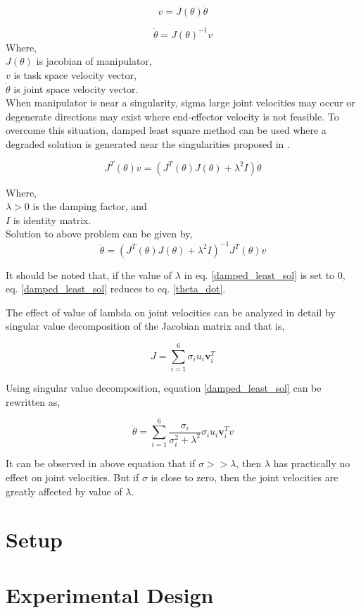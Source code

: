 \begin{equation}\label{theta_dot}
	v = J(\theta) \dot{\theta} 
\end{equation}

\begin{equation}
	\dot{\theta} = J(\theta)^{-1}  v
\end{equation} 
Where, \\
$J(\theta)$ is jacobian of manipulator, \\
$v$ is task space velocity vector, \\
$\dot{\theta}$ is joint space velocity vector. \\

When manipulator is near a singularity, sigma  large joint velocities may occur or degenerate directions may exist where end-effector velocity
is not feasible\cite{chiaverini1994review}. To overcome this situation, damped least square method can be used where a degraded solution is generated near the singularities proposed in \cite{wampler1986manipulator, nakamura1986inverse}.  

\begin{equation}
	J^{T}(\theta)v = (J^{T}(\theta)J(\theta) + \lambda ^{2}I)\dot{\theta}
\end{equation}

Where, \\
$\lambda > 0 $ is the damping factor, and \\
$I $ is identity matrix. \\

Solution to above problem can be given by, 
\begin{equation}\label{damped_least_sol}
	\dot{\theta} = (J^{T}(\theta)J(\theta) + \lambda^{2}I)^{-1}J^{T}(\theta)v
\end{equation} 

It should be noted that, if the value of $\lambda$ in eq. \ref{damped_least_sol} is set to 0, eq. \ref{damped_least_sol} reduces to eq. \ref{theta_dot}.

The effect of value of lambda on joint velocities can be analyzed in detail by singular value decomposition of the Jacobian matrix and that is, 

\begin{equation}
	J = \sum_{i=1}^{6}\sigma_{i}u_{i}\textbf{v}_{i}^{T}
\end{equation} 

Using singular value decomposition, equation \ref{damped_least_sol} can be rewritten as,

\begin{equation}
\dot{\theta} = \sum_{i=1}^{6}\frac{\sigma_{i}}{\sigma_{i}^{2} + \lambda^{2} }\sigma_{i}u_{i}\textbf{v}_{i}^{T}v
\end{equation} 

It can be observed in above equation that if $\sigma >> \lambda$, then $\lambda$ has practically no effect on joint velocities. But if $\sigma$ is close to zero, then the joint velocities are greatly affected by value of $\lambda$.  
\section{Setup}

\section{Experimental Design}
